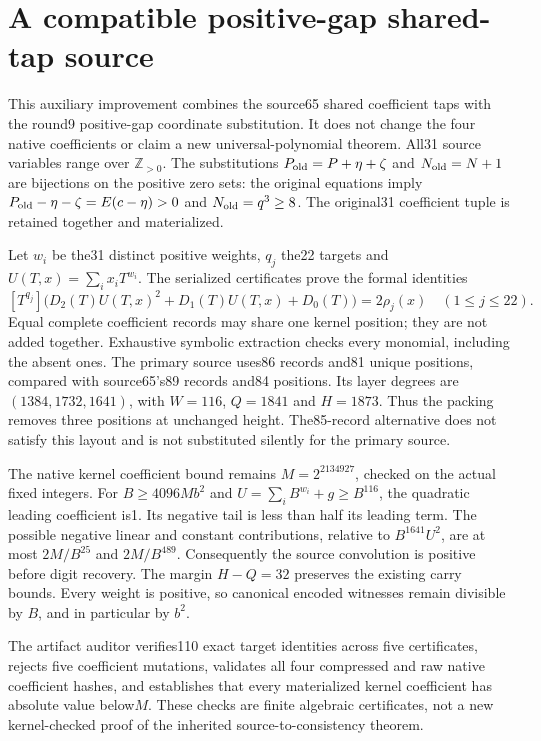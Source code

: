 \section{A compatible positive-gap shared-tap source}
\label{sec:gapshared}
This auxiliary improvement combines the source65 shared coefficient taps with
the round9 positive-gap coordinate substitution.  It does not change the four
native coefficients or claim a new universal-polynomial theorem.
All31 source variables range over $\mathbb Z_{>0}$.
The substitutions $P_{\rm old}=P+\eta+\zeta$ and $N_{\rm old}=N+1$ are
bijections on the positive zero sets: the original equations imply
$P_{\rm old}-\eta-\zeta=E(c-\eta)>0$ and $N_{\rm old}=q^3\ge8$.
The original31 coefficient tuple is retained together and materialized.

Let $w_i$ be the31 distinct positive weights, $q_j$ the22 targets and
$U(T,x)=\sum_i x_iT^{w_i}$.  The serialized certificates prove the formal
identities
\[
 [T^{q_j}]\bigl(D_2(T)U(T,x)^2+D_1(T)U(T,x)+D_0(T)\bigr)=2\rho_j(x)
 \quad(1\le j\le22).
\]
Equal complete coefficient records may share one kernel position; they are
not added together.  Exhaustive symbolic extraction checks every monomial,
including the absent ones.  The primary source uses86 records and81 unique
positions, compared with source65's89 records and84 positions.
Its layer degrees are $(1384,1732,1641)$, with $W=116$, $Q=1841$ and
$H=1873$.  Thus the packing removes three positions at unchanged height.
The85-record alternative does not satisfy this layout and is not substituted
silently for the primary source.

The native kernel coefficient bound remains $M=2^{2134927}$, checked on the
actual fixed integers.  For $B\ge4096Mb^2$ and
$U=\sum_i B^{w_i}+g\ge B^{116}$, the quadratic leading coefficient is1.
Its negative tail is less than half its leading term.  The possible negative
linear and constant contributions, relative to $B^{1641}U^2$, are at most
$2M/B^{25}$ and $2M/B^{489}$.  Consequently the source convolution is
positive before digit recovery.  The margin $H-Q=32$ preserves the existing
carry bounds.  Every weight is positive, so canonical encoded witnesses
remain divisible by $B$, and in particular by $b^2$.

The artifact auditor verifies110 exact target identities across five
certificates, rejects five coefficient mutations, validates all four
compressed and raw native coefficient hashes, and establishes that every
materialized kernel coefficient has absolute value below$M$.
These checks are finite algebraic certificates, not a new kernel-checked
proof of the inherited source-to-consistency theorem.
